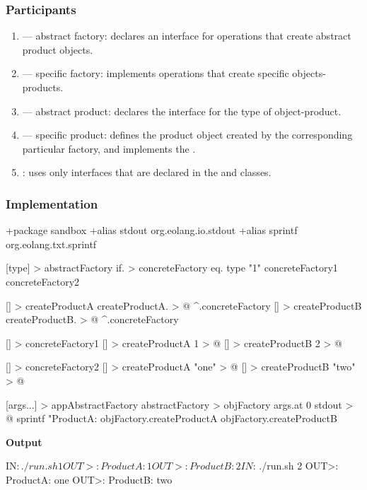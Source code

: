 \documentclass[12pt]{book}
\begin{document}
{{\subsubsection{Participants}
\begin{enumerate}
    \item {} — abstract factory: declares an interface for operations that create abstract product objects.
    \item {} — specific factory: implements operations that create specific objects-products.
    \item {} — abstract product: declares the interface for the type of object-product.
    \item {} — specific product: defines the product object created by the corresponding particular factory, and implements the .
    \item {}: uses only interfaces that are declared in the  and  classes.
\end{enumerate}

\subsubsection{Implementation}
\begin{ffcode}
+package sandbox
+alias stdout org.eolang.io.stdout
+alias sprintf org.eolang.txt.sprintf

[type] > abstractFactory
  if. > concreteFactory
    eq.
      type
      "1"
    concreteFactory1
    concreteFactory2

  [] > createProductA
    createProductA. > @
      ^.concreteFactory
  [] > createProductB
    createProductB. > @
      ^.concreteFactory

  [] > concreteFactory1
    [] > createProductA
      1 > @
    [] > createProductB
      2 > @

  [] > concreteFactory2
    [] > createProductA
      "one" > @
    [] > createProductB
      "two" > @

[args...] > appAbstractFactory
  abstractFactory > objFactory
    args.at 0
  stdout > @
    sprintf
      "ProductA: %
      objFactory.createProductA
      objFactory.createProductB

\end{ffcode}
\textbf{Output}
\begin{ffcode}
IN$: ./run.sh 1
OUT>: ProductA: 1
OUT>: ProductB: 2
IN$: ./run.sh 2
OUT>: ProductA: one
OUT>: ProductB: two
\end{ffcode}


}}
\end{document}
